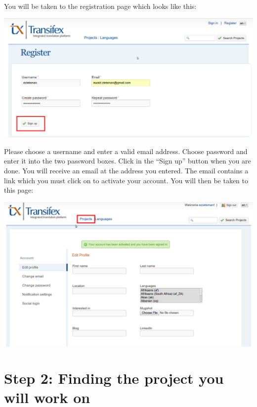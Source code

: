 \documentclass[10pt, a4paper]{article}
\begin{document}
You will be taken to the registration page which looks like this:
\begin{center}
    \centerline{\includegraphics[width=0.8\paperwidth]{images/enterdetails.png}}
\end{center}
Please choose a username and enter a valid email address. Choose password and enter it into the two password boxes. Click in the ``Sign up'' button when you are done. You will receive an email at the address you entered. The email contains a link which you must click on to activate your account. You will then be taken to this page:
\begin{center}
    \centerline{\includegraphics[width=0.8\paperwidth]{images/signedin.png}}
\end{center}



\section*{Step 2: Finding the project you will work on}
\end{document}
